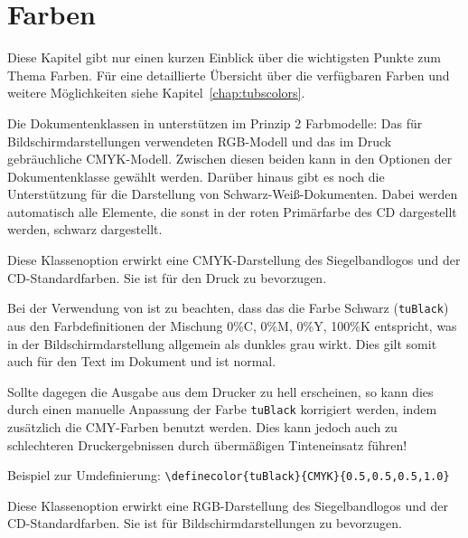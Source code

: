 \section{Farben}

Diese Kapitel gibt nur einen kurzen Einblick über die wichtigsten Punkte
zum Thema Farben. Für eine detaillierte Übersicht über die verfügbaren Farben
und weitere Möglichkeiten siehe Kapitel~\ref{chap:tubscolors}.%

Die Dokumentenklassen in \tubslatex unterstützen im Prinzip 2 Farbmodelle:
Das für Bildschirmdarstellungen verwendeten RGB-Modell und das im
Druck gebräuchliche CMYK-Modell. Zwischen diesen beiden kann in den Optionen
der Dokumentenklasse gewählt werden. Darüber hinaus gibt es noch die Unterstützung
für die Darstellung von Schwarz-Weiß-Dokumenten. Dabei werden automatisch
alle Elemente, die sonst in der roten Primärfarbe des CD dargestellt werden,
schwarz dargestellt.

\begin{Declaration}
\end{Declaration}

Diese Klassenoption erwirkt eine CMYK-Darstellung des Siegelbandlogos und der
CD-Standardfarben. Sie ist für den Druck zu bevorzugen.

\begin{important}
  Bei der Verwendung von  ist zu beachten,
  dass das die Farbe Schwarz (\texttt{tuBlack})
  aus den Farbdefinitionen der Mischung 0\%C, 0\%M, 0\%Y, 100\%K entspricht,
  was in der Bildschirmdarstellung allgemein als dunkles grau wirkt. Dies
  gilt somit auch für den Text im Dokument und ist normal.

  Sollte dagegen die Ausgabe aus dem Drucker zu hell erscheinen, so kann dies
  durch einen manuelle Anpassung der Farbe \texttt{tuBlack} korrigiert werden,
  indem zusätzlich die CMY-Farben benutzt werden. Dies kann jedoch auch zu
  schlechteren Druckergebnissen durch übermäßigen Tinteneinsatz führen!
  
  Beispiel zur Umdefinierung:
  \lstinline!\definecolor{tuBlack}{CMYK}{0.5,0.5,0.5,1.0}!
\end{important}

\begin{Declaration}
\end{Declaration}

Diese Klassenoption erwirkt eine RGB-Darstellung des Siegelbandlogos und der
CD-Standardfarben. Sie ist für Bildschirmdarstellungen zu bevorzugen.

